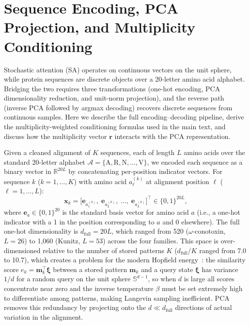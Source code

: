 
\section{Sequence Encoding, PCA Projection, and Multiplicity Conditioning}\label{app:pca}

Stochastic attention (SA) operates on continuous vectors on the unit sphere,
while protein sequences are discrete objects over a 20-letter amino acid
alphabet. Bridging the two requires three transformations (one-hot encoding,
PCA dimensionality reduction, and unit-norm projection), and the reverse path
(inverse PCA followed by argmax decoding) recovers discrete sequences from
continuous samples. Here we describe the full encoding--decoding pipeline,
derive the multiplicity-weighted conditioning formulas used in the main text,
and discuss how the multiplicity vector $\mathbf{r}$ interacts with the PCA
representation.

Given a cleaned alignment of $K$ sequences, each of length $L$ amino acids
over the standard 20-letter alphabet
$\mathcal{A} = \{\text{A}, \text{R}, \text{N}, \ldots, \text{V}\}$, we
encoded each sequence as a binary vector in $\mathbb{R}^{20L}$ by
concatenating per-position indicator vectors. For sequence $k$ ($k = 1,
\ldots, K$) with amino acid $a_\ell^{(k)}$ at alignment position $\ell$
($\ell = 1, \ldots, L$):
\begin{equation}
  \mathbf{x}_k = \bigl[\mathbf{e}_{a_1^{(k)}},\; \mathbf{e}_{a_2^{(k)}},\;
    \ldots,\; \mathbf{e}_{a_L^{(k)}}\bigr]^\top \in \{0,1\}^{20L},
\end{equation}
where $\mathbf{e}_a \in \{0,1\}^{20}$ is the standard basis vector for amino
acid $a$ (i.e., a one-hot indicator with a 1 in the position corresponding to
$a$ and 0 elsewhere). The full one-hot dimensionality is
$d_{\mathrm{full}} = 20L$, which ranged from 520 ($\omega$-conotoxin,
$L{=}26$) to 1{,}060 (Kunitz, $L{=}53$) across the four families. This space
is over-dimensioned relative to the number of stored patterns $K$
($d_{\mathrm{full}}/K$ ranged from 7.0 to 10.7), which creates a problem for
the modern Hopfield energy~\cite{ramsauerHopfieldNetworksAll2021}: the
similarity score $e_k = \mathbf{m}_k^\top\boldsymbol{\xi}$ between a stored
pattern $\mathbf{m}_k$ and a query state $\boldsymbol{\xi}$ has variance
$1/d$ for a random query on the unit sphere $\mathbb{S}^{d-1}$, so when $d$
is large all scores concentrate near zero and the inverse temperature $\beta$
must be set extremely high to differentiate among patterns, making Langevin
sampling inefficient. PCA removes this redundancy by projecting onto the
$d \ll d_{\mathrm{full}}$ directions of actual variation in the alignment.

